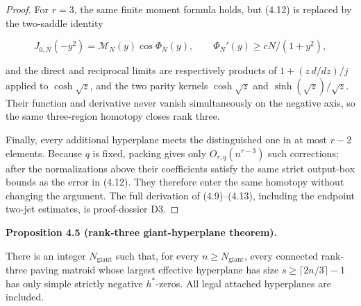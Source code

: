 \documentclass[10pt]{article}
\newenvironment{mdstatement}[1]
  {\par\Needspace{0.16\textheight}\noindent\textbf{#1.}\ \itshape}
  {\par\normalfont}
\begin{document}
\begin{proof}
For $r=3$, the same finite moment formula holds, but (4.12) is replaced by
the two-saddle identity

\[
 J_{0,N}(-y^2)=\mathcal M_N(y)\cos\Phi_N(y),\qquad
 \Phi_N'(y)\ge cN/(1+y^2), \tag{4.13}
\]

and the direct and reciprocal limits are respectively products of
$1+(z\,d/dz)/j$ applied to $\cosh\sqrt z$, and the two parity kernels
$\cosh\sqrt z$ and $\sinh(\sqrt z)/\sqrt z$.  Their function and
derivative never vanish simultaneously on the negative axis, so the same
three-region homotopy closes rank three.

Finally, every additional hyperplane meets the distinguished one in at most
$r-2$ elements.  Because $q$ is fixed, packing gives only
$O_{r,q}(n^{r-3})$ such corrections; after the normalizations above their
coefficients satisfy the same strict output-box bounds as the error in
(4.12).  They therefore enter the same homotopy without changing the argument.
The full derivation of (4.9)--(4.13), including the endpoint two-jet estimates,
is proof-dossier D3.
\end{proof}


\begin{mdstatement}{Proposition 4.5 (rank-three giant-hyperplane theorem)}


There is an integer $N_{\mathrm{giant}}$ such that, for every
$n\ge N_{\mathrm{giant}}$, every connected rank-three paving matroid whose
largest effective hyperplane has size
$s\ge\lceil2n/3\rceil-1$ has only simple strictly negative $h^*$-zeros.
All legal attached hyperplanes are included.

\end{mdstatement}
\end{document}
